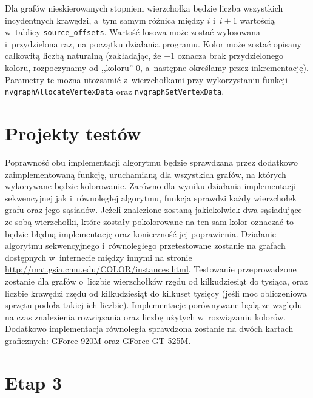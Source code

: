 \documentclass{article}
\begin{document}
	Dla grafów nieskierowanych stopniem wierzchołka będzie liczba wszystkich incydentnych krawędzi, a~tym samym różnica między $i$ i~$i+1$ wartością w~tablicy \texttt{source\_offsets}. Wartość losowa może zostać wylosowana i~przydzielona raz, na początku działania programu. Kolor może zostać opisany całkowitą liczbą naturalną (zakładając, że $-1$ oznacza brak przydzielonego koloru, rozpoczynamy od ,,koloru'' 0, a~następne określamy przez inkrementację). Parametry te można utożsamić z~wierzchołkami przy wykorzystaniu funkcji \texttt{nvgraphAllocateVertexData} oraz \texttt{nvgraphSetVertexData}.
	
	\section{Projekty testów}
	Poprawność obu implementacji algorytmu będzie sprawdzana przez dodatkowo zaimplementowaną funkcję, uruchamianą dla wszystkich grafów, na których wykonywane będzie kolorowanie. Zarówno dla wyniku działania implementacji sekwencyjnej jak i~równoległej algorytmu, funkcja sprawdzi każdy wierzchołek grafu oraz jego sąsiadów. Jeżeli znalezione zostaną jakiekolwiek dwa sąsiadujące ze sobą wierzchołki, które zostały pokolorowane na ten sam kolor oznaczać to będzie błędną implementację oraz konieczność jej poprawienia. Działanie algorytmu sekwencyjnego i~równoległego przetestowane zostanie na grafach dostępnych w~internecie między innymi na stronie \url{http://mat.gsia.cmu.edu/COLOR/instances.html}. Testowanie przeprowadzone zostanie dla grafów o~liczbie wierzchołków rzędu od kilkudziesiąt do tysiąca, oraz liczbie krawędzi rzędu od kilkudziesiąt do kilkuset tysięcy (jeśli moc obliczeniowa sprzętu podoła takiej ich liczbie). Implementacje porównywane będą ze względu na czas znalezienia rozwiązania oraz liczbę użytych w~rozwiązaniu kolorów. Dodatkowo implementacja równoległa sprawdzona zostanie na dwóch kartach graficznych: GForce 920M oraz GForce GT 525M.
	
	\section{Etap 3}
\end{document}
